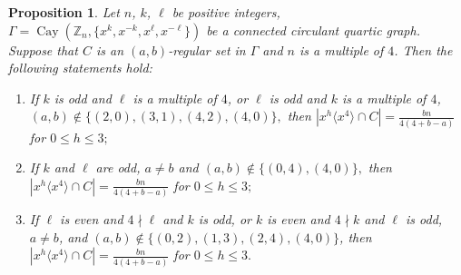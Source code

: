 \documentclass[12pt]{article}
\newtheorem{propA}{Proposition}[subsection]
\begin{document}
    \begin{propA}\label{prop:4-nkl}
   	Let $n$, $k$, $\ell$ be positive integers,
   	$\Gamma=\operatorname{Cay}(\mathbb{Z}_n,\{x^{k},x^{-k},x^{\ell},x^{-\ell}\})$
   	be a connected circulant quartic graph. Suppose that $C$ is an $(a,b)$-regular set in $\Gamma$ and $n$ is a multiple of $4$. Then the following statements hold:
   	 	\begin{enumerate}
   		\item[(i)] If \(k\) is odd and \(\ell\) is a multiple of \(4\), or \(\ell\) is odd and \(k\) is a multiple of \(4\),
   		$
   		(a,b)\notin\{(2,0),(3,1),(4,2),(4,0)\},
   		$
   		then $	\left|x^{h}\langle x^{4}\rangle\cap C\right|
   		=\frac{bn}{4(4+b-a)}$
   		for $0\le h\le 3;$
   		\item[(ii)]  If $k$ and $\ell$ are odd, $a\neq b$ and
   		$
   		(a,b)\notin\{(0,4),(4,0)\},
   		$
   		then
   		$
   		\left|x^{h}\langle x^{4}\rangle\cap C\right|
   		=\frac{bn}{4(4+b-a)}$
   		for $ 0\le h\le 3;$
   		
   		\item[(iii)] If \(\ell\) is even and \(4\nmid \ell\) and \(k\) is odd, or \(k\) is even and \(4\nmid k\) and \(\ell\) is odd, $a\neq b$, and $(a,b)\notin\{(0,2),(1,3),(2,4),(4,0)\}$, then $
   		\left|x^{h}\langle x^{4}\rangle\cap C\right|
   		=\frac{bn}{4(4+b-a)}$
   		for $ 0\le h\le 3.$
   	\end{enumerate}
   \end{propA}	
\end{document}
